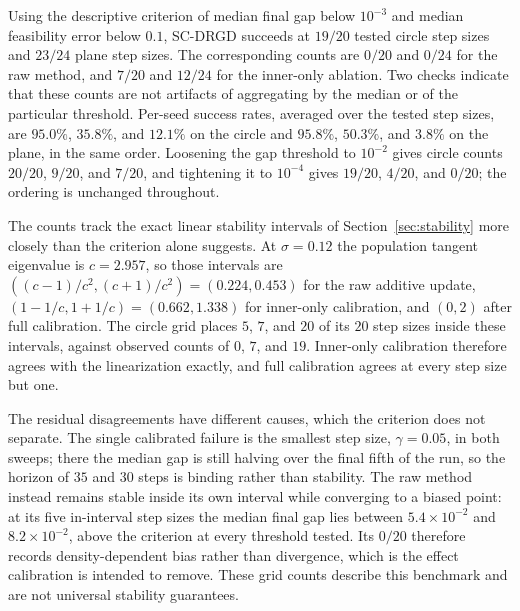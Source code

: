 \documentclass[10pt]{article}
\theoremstyle{c2fup}
\begin{document}
Using the descriptive criterion of median final gap below $10^{-3}$ and median feasibility error below $0.1$, SC-DRGD succeeds at $19/20$ tested circle step sizes and $23/24$ plane step sizes.  The corresponding counts are $0/20$ and $0/24$ for the raw method, and $7/20$ and $12/24$ for the inner-only ablation.  Two checks indicate that these counts are not artifacts of aggregating by the median or of the particular threshold.  Per-seed success rates, averaged over the tested step sizes, are $95.0\%$, $35.8\%$, and $12.1\%$ on the circle and $95.8\%$, $50.3\%$, and $3.8\%$ on the plane, in the same order.  Loosening the gap threshold to $10^{-2}$ gives circle counts $20/20$, $9/20$, and $7/20$, and tightening it to $10^{-4}$ gives $19/20$, $4/20$, and $0/20$; the ordering is unchanged throughout.

The counts track the exact linear stability intervals of Section~\ref{sec:stability} more closely than the criterion alone suggests.  At $\sigma=0.12$ the population tangent eigenvalue is $c=2.957$, so those intervals are $((c-1)/c^2,(c+1)/c^2)=(0.224,0.453)$ for the raw additive update, $(1-1/c,1+1/c)=(0.662,1.338)$ for inner-only calibration, and $(0,2)$ after full calibration.  The circle grid places $5$, $7$, and $20$ of its $20$ step sizes inside these intervals, against observed counts of $0$, $7$, and $19$.  Inner-only calibration therefore agrees with the linearization exactly, and full calibration agrees at every step size but one.

The residual disagreements have different causes, which the criterion does not separate.  The single calibrated failure is the smallest step size, $\gamma=0.05$, in both sweeps; there the median gap is still halving over the final fifth of the run, so the horizon of $35$ and $30$ steps is binding rather than stability.  The raw method instead remains stable inside its own interval while converging to a biased point: at its five in-interval step sizes the median final gap lies between $5.4\times10^{-2}$ and $8.2\times10^{-2}$, above the criterion at every threshold tested.  Its $0/20$ therefore records density-dependent bias rather than divergence, which is the effect calibration is intended to remove.  These grid counts describe this benchmark and are not universal stability guarantees.
\end{document}
